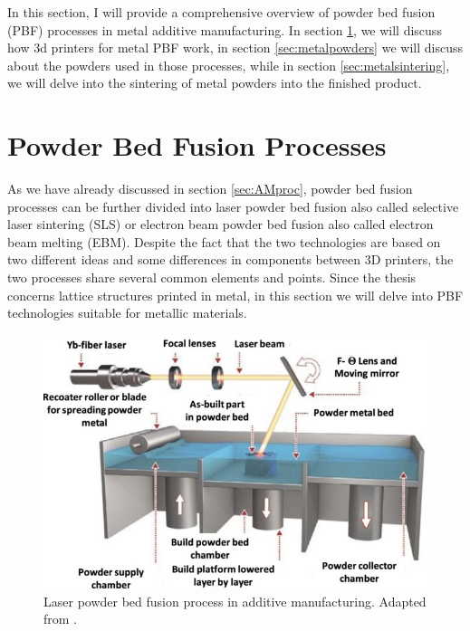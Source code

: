 \setlength{\tabcolsep}{10pt}
In this section, I will provide a comprehensive overview of powder bed fusion (PBF) processes in metal additive manufacturing. In section \ref{sec:pbf_proc}, we will discuss how 3d printers for metal PBF work, in section \ref{sec:metalpowders} we will discuss about the powders used in those processes, while in section \ref{sec:metalsintering}, we will delve into the sintering of metal powders into the finished product.

\section{Powder Bed Fusion Processes}\label{sec:pbf_proc}
As we have already discussed in section \ref{sec:AMproc}, powder bed fusion processes can be further divided into laser powder bed fusion also called selective laser sintering (SLS) or electron beam powder bed fusion also called electron beam melting (EBM). Despite the fact that the two technologies are based on two different ideas and some differences in components between 3D printers, the two processes share several common elements and points. Since the thesis concerns lattice structures printed in metal, in this section we will delve into PBF technologies suitable for metallic materials. 
\begin{figure}[H]
    \centering
    \includegraphics[scale=1.3]{Images/PBF.jpg}
    \caption[Laser PBF in AM.]{Laser powder bed fusion process in additive manufacturing. Adapted from \cite{ozel_focus_2020}.}
    \label{fig:PBF}
\end{figure}

